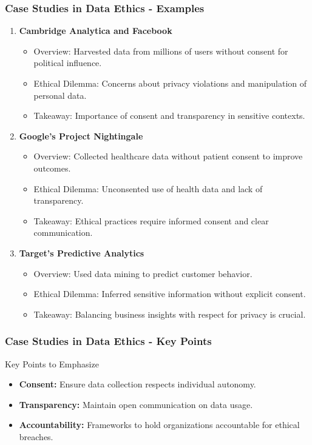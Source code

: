 \documentclass[aspectratio=169]{beamer}
\begin{document}
\begin{frame}[fragile]
    \frametitle{Case Studies in Data Ethics - Examples}
    \begin{enumerate}
        \item \textbf{Cambridge Analytica and Facebook}
        \begin{itemize}
            \item Overview: Harvested data from millions of users without consent for political influence.
            \item Ethical Dilemma: Concerns about privacy violations and manipulation of personal data.
            \item Takeaway: Importance of consent and transparency in sensitive contexts.
        \end{itemize}
        
        \item \textbf{Google's Project Nightingale}
        \begin{itemize}
            \item Overview: Collected healthcare data without patient consent to improve outcomes.
            \item Ethical Dilemma: Unconsented use of health data and lack of transparency.
            \item Takeaway: Ethical practices require informed consent and clear communication.
        \end{itemize}
        
        \item \textbf{Target's Predictive Analytics}
        \begin{itemize}
            \item Overview: Used data mining to predict customer behavior.
            \item Ethical Dilemma: Inferred sensitive information without explicit consent.
            \item Takeaway: Balancing business insights with respect for privacy is crucial.
        \end{itemize}
    \end{enumerate}
\end{frame}

\begin{frame}[fragile]
    \frametitle{Case Studies in Data Ethics - Key Points}
    \begin{block}{Key Points to Emphasize}
        \begin{itemize}
            \item \textbf{Consent:} Ensure data collection respects individual autonomy.
            \item \textbf{Transparency:} Maintain open communication on data usage.
            \item \textbf{Accountability:} Frameworks to hold organizations accountable for ethical breaches.
        \end{itemize}
    \end{block}
\end{frame}
\end{document}
